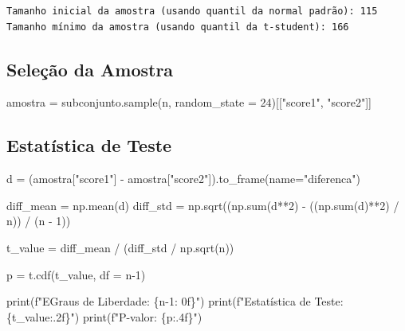 \documentclass[
  letterpaper,
  DIV=11,
  numbers=noendperiod]{scrreprt}
\newenvironment{Shaded}{\begin{snugshade}}{\end{snugshade}}
\newcommand{\BuiltInTok}[1]{\textcolor[rgb]{0.00,0.23,0.31}{#1}}
\newcommand{\DecValTok}[1]{\textcolor[rgb]{0.68,0.00,0.00}{#1}}
\newcommand{\NormalTok}[1]{\textcolor[rgb]{0.00,0.23,0.31}{#1}}
\newcommand{\OperatorTok}[1]{\textcolor[rgb]{0.37,0.37,0.37}{#1}}
\newcommand{\SpecialCharTok}[1]{\textcolor[rgb]{0.37,0.37,0.37}{#1}}
\newcommand{\SpecialStringTok}[1]{\textcolor[rgb]{0.13,0.47,0.30}{#1}}
\newcommand{\StringTok}[1]{\textcolor[rgb]{0.13,0.47,0.30}{#1}}
\begin{document}
\begin{verbatim}
Tamanho inicial da amostra (usando quantil da normal padrão): 115
Tamanho mínimo da amostra (usando quantil da t-student): 166
\end{verbatim}

\subsection{Seleção da Amostra}\label{seleuxe7uxe3o-da-amostra-1}

\begin{Shaded}
\begin{Highlighting}[]
\NormalTok{amostra }\OperatorTok{=}\NormalTok{ subconjunto.sample(n, random\_state }\OperatorTok{=} \DecValTok{24}\NormalTok{)[[}\StringTok{"score1"}\NormalTok{, }\StringTok{"score2"}\NormalTok{]]}
\end{Highlighting}
\end{Shaded}

\subsection{Estatística de Teste}\label{estatuxedstica-de-teste-1}

\begin{Shaded}
\begin{Highlighting}[]
\NormalTok{d }\OperatorTok{=}\NormalTok{ (amostra[}\StringTok{"score1"}\NormalTok{] }\OperatorTok{{-}}\NormalTok{ amostra[}\StringTok{"score2"}\NormalTok{]).to\_frame(name}\OperatorTok{=}\StringTok{"diferenca"}\NormalTok{)}

\NormalTok{diff\_mean }\OperatorTok{=}\NormalTok{ np.mean(d)}
\NormalTok{diff\_std }\OperatorTok{=}\NormalTok{ np.sqrt((np.}\BuiltInTok{sum}\NormalTok{(d}\OperatorTok{**}\DecValTok{2}\NormalTok{) }\OperatorTok{{-}}\NormalTok{ ((np.}\BuiltInTok{sum}\NormalTok{(d)}\OperatorTok{**}\DecValTok{2}\NormalTok{) }\OperatorTok{/}\NormalTok{ n)) }\OperatorTok{/}\NormalTok{ (n }\OperatorTok{{-}} \DecValTok{1}\NormalTok{))}

\NormalTok{t\_value }\OperatorTok{=}\NormalTok{ diff\_mean }\OperatorTok{/}\NormalTok{ (diff\_std }\OperatorTok{/}\NormalTok{ np.sqrt(n))}


\NormalTok{p }\OperatorTok{=}\NormalTok{ t.cdf(t\_value, df }\OperatorTok{=}\NormalTok{ n}\OperatorTok{{-}}\DecValTok{1}\NormalTok{)}


\BuiltInTok{print}\NormalTok{(}\SpecialStringTok{f"EGraus de Liberdade: }\SpecialCharTok{\{}\NormalTok{n}\OperatorTok{{-}}\DecValTok{1}\SpecialCharTok{: 0f\}}\SpecialStringTok{"}\NormalTok{)}
\BuiltInTok{print}\NormalTok{(}\SpecialStringTok{f"Estatística de Teste: }\SpecialCharTok{\{}\NormalTok{t\_value}\SpecialCharTok{:.2f\}}\SpecialStringTok{"}\NormalTok{)}
\BuiltInTok{print}\NormalTok{(}\SpecialStringTok{f"P{-}valor: }\SpecialCharTok{\{}\NormalTok{p}\SpecialCharTok{:.4f\}}\SpecialStringTok{"}\NormalTok{)}
\end{Highlighting}
\end{Shaded}
\end{document}
